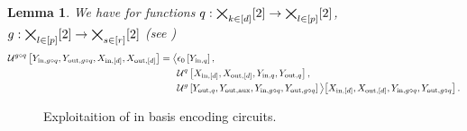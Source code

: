 \documentclass[aps,onecolumn,nofootinbib,pra]{article}
\newtheorem{lemma}{Lemma}
\begin{document}
    \begin{lemma}
        We have for functions $q:\bigtimes_{k\in[d]}[2]\rightarrow\bigtimes_{l\in[p]}[2]$, $g:\bigtimes_{l\in[p]}[2]\rightarrow\bigtimes_{s\in[r]}[2]$ (see )
        \begin{align*}
            \mathcal{U}^{g\circ q}\left[Y_{\mathrm{in},g\circ q},Y_{\mathrm{out},g\circ q},X_{\mathrm{in},[d]},X_{\mathrm{out},[d]}\right]
            = \big\langle 
                &\epsilon_{0}\left[Y_{\mathrm{in},q}\right],\\
                &\mathcal{U}^{q}\left[X_{\mathrm{in},[d]},X_{\mathrm{out},[d]},Y_{\mathrm{in},q},Y_{\mathrm{out},q}\right],\\
                &\mathcal{U}^{g}\left[Y_{\mathrm{out},q},Y_{\mathrm{out},\mathrm{aux}},Y_{\mathrm{in},g\circ q},Y_{\mathrm{out},g\circ q}\right]
             \big\rangle \big[ 
                X_{\mathrm{in},[d]},X_{\mathrm{out},[d]},Y_{\mathrm{in},g\circ q},Y_{\mathrm{out},g\circ q}
             \big] \, .
        \end{align*}
    \end{lemma}


    \begin{figure}
        \begin{center}
            
        \end{center}
        \caption{
           Exploitaition of \DecompositionSparsity{} in basis encoding circuits.
        }\label{fig:qcbencodingDecomposition}
    \end{figure}
\end{document}
